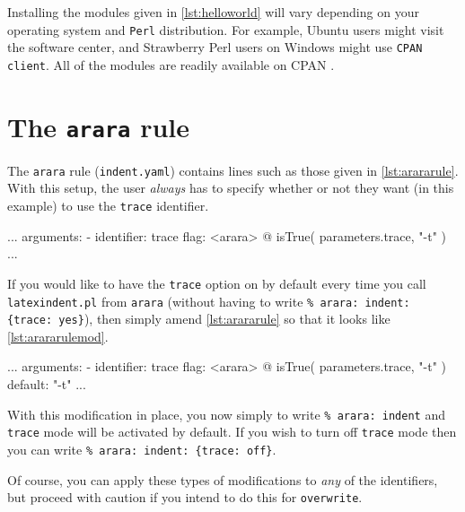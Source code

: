 Installing the modules given in \cref{lst:helloworld} will vary depending on your 
operating system and \lstinline!Perl! distribution. For example, Ubuntu users 
might visit the software center, and Strawberry Perl users on Windows might use 
\lstinline!CPAN client!. All of the modules are readily available on CPAN \cite{cpan}.

\section{The \lstinline!arara! rule}
The \lstinline!arara! rule (\lstinline!indent.yaml!) contains lines such as those
given in \cref{lst:arararule}. With this setup, the user \emph{always} has 
to specify whether or not they want (in this example) to use the \lstinline!trace!
identifier.
\begin{yaml}[caption={The \lstinline!arara! rule},label={lst:arararule},numbers=none]
...
arguments:
- identifier: trace
  flag: <arara> @{ isTrue( parameters.trace, "-t" ) }
...
\end{yaml}

If you would like to have the \lstinline!trace! option on by default every time you 
call \lstinline!latexindent.pl! from \lstinline!arara! (without having to write \lstinline!% arara: indent: {trace: yes}!), then simply
amend \cref{lst:arararule} so that it looks like \cref{lst:arararulemod}.
\begin{yaml}[caption={The \lstinline!arara! rule (modified)},label={lst:arararulemod},numbers=none]
...
arguments:
- identifier: trace
  flag: <arara> @{ isTrue( parameters.trace, "-t" ) }
  default: "-t"
...
\end{yaml}

With this modification in place, you now simply to write \lstinline!% arara: indent! and 
\lstinline!trace! mode will be activated by default. If you wish to turn off \lstinline!trace!
mode then you can write \lstinline!% arara: indent: {trace: off}!.

Of course, you can apply these types of modifications to \emph{any} of the identifiers, 
but proceed with caution if you intend to do this for \lstinline!overwrite!.


